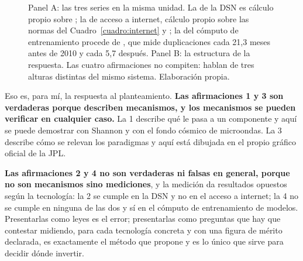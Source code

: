 \documentclass[11pt,letterpaper]{article}
\begin{document}
\begin{figure}[!htb]
\caption{Panel A: las tres series en la misma unidad. La de la DSN es cálculo
propio sobre \textcite{descanso2015}; la de acceso a internet, cálculo propio
sobre las normas del Cuadro~\ref{cuadro:internet} y
\textcite{nielsen2019}; la del cómputo de entrenamiento procede de
\textcite{sevilla2022}, que mide duplicaciones cada 21,3 meses antes de 2010 y
cada 5,7 después. Panel B: la estructura de la respuesta. Las cuatro
afirmaciones no compiten: hablan de tres alturas distintas del mismo sistema.
Elaboración propia.}
\label{fig:sintesis}
\end{figure}

Eso es, para mí, la respuesta al planteamiento. \textbf{Las afirmaciones 1 y 3
son verdaderas porque describen mecanismos, y los mecanismos se pueden
verificar en cualquier caso.} La 1 describe qué le pasa a un componente y aquí
se puede demostrar con Shannon y con el fondo cósmico de microondas. La 3
describe cómo se relevan los paradigmas y aquí está dibujada en el propio
gráfico oficial de la JPL.

\textbf{Las afirmaciones 2 y 4 no son verdaderas ni falsas en general, porque
no son mecanismos sino mediciones}, y la medición da resultados opuestos según
la tecnología: la 2 se cumple en la DSN y no en el acceso a internet; la 4 no
se cumple en ninguna de las dos y sí en el cómputo de entrenamiento de
modelos. Presentarlas como leyes es el error; presentarlas como preguntas que
hay que contestar midiendo, para cada tecnología concreta y con una figura de
mérito declarada, es exactamente el método que propone \textcite{deweck2022} y
es lo único que sirve para decidir dónde invertir.
\end{document}
